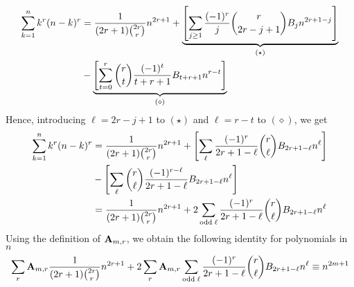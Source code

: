 \begin{equation*}
    \begin{split}
        \sum_{k=1}^{n} k^{r} (n-k)^{r}
        &= \frac{1}{(2r+1) \binom{2r}r} n^{2r+1}
        + \underbrace{\left[ \sum_{j \geq 1} \frac{(-1)^r}{j} \binom{r}{2r-j+1} {B}\sb{j} n^{2r+1-j} \right]}_{(\star)} \\
        &- \underbrace{\left[ \sum_{t=0}^{r} \binom{r}{t} \frac{(-1)^t}{t+r+1} {B}\sb{t+r+1} n^{r-t} \right]}_{(\diamond)}
    \end{split}
\end{equation*}
Hence, introducing $\ell=2r-j+1$ to $(\star)$ and $\ell=r-t$ to $(\diamond)$, we get
\begin{equation}
    \begin{split}
        \sum_{k=1}^{n} k^{r} (n-k)^{r}
        &= \frac{1}{(2r+1) \binom{2r}r} n^{2r+1}
        + \left[ \sum_{\ell} \frac{(-1)^r}{2r+1-\ell} \binom{r}{\ell} {B}\sb{2r+1-\ell} n^{\ell} \right] \\
        &- \left[ \sum_{\ell} \binom{r}{\ell} \frac{(-1)^{r-\ell}}{2r+1-\ell} {B}\sb{2r+1-\ell} n^{\ell} \right]\\
        &= \frac{1}{(2r+1) \binom{2r}r} n^{2r+1} + 2 \sum_{\mathrm{odd \; \ell}} \frac{(-1)^r}{2r+1-\ell} \binom{r}{\ell} {B}\sb{2r+1-\ell} n^{\ell}
    \end{split}\label{eq:polynomial-sum-1}
\end{equation}
Using the definition of ${\mathbf{A}} \sb{m,r}$, we obtain the following identity for polynomials in $n$
\begin{equation}
    \label{eq:equation}
    \sum_{r} {\mathbf{A}} \sb{m,r} \frac{1}{(2r+1) \binom{2r}r} n^{2r+1}
    + 2 \sum_{r} {\mathbf{A}} \sb{m,r} \sum_{\mathrm{odd \; \ell}} \frac{(-1)^r}{2r+1-\ell} \binom{r}{\ell} {B}\sb{2r+1-\ell} n^{\ell}
    \equiv n^{2m+1}
\end{equation}
